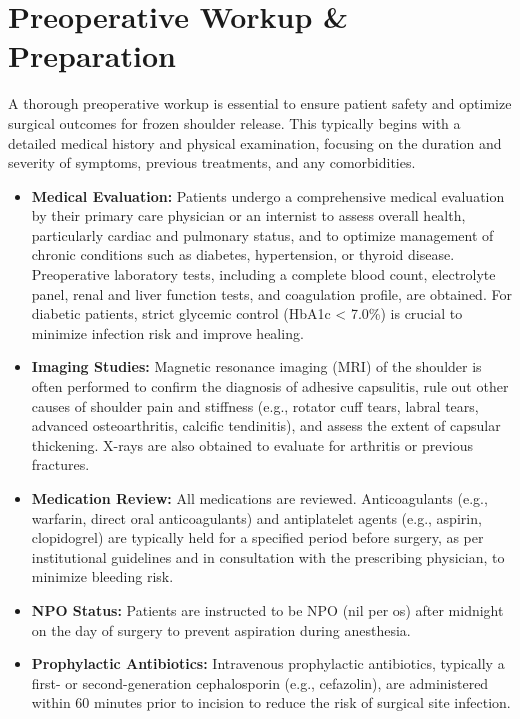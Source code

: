 \section*{Preoperative Workup \& Preparation}
A thorough preoperative workup is essential to ensure patient safety and optimize surgical outcomes for frozen shoulder release. This typically begins with a detailed medical history and physical examination, focusing on the duration and severity of symptoms, previous treatments, and any comorbidities.

\begin{itemize}
  \item \textbf{Medical Evaluation:} Patients undergo a comprehensive medical evaluation by their primary care physician or an internist to assess overall health, particularly cardiac and pulmonary status, and to optimize management of chronic conditions such as diabetes, hypertension, or thyroid disease. Preoperative laboratory tests, including a complete blood count, electrolyte panel, renal and liver function tests, and coagulation profile, are obtained. For diabetic patients, strict glycemic control (HbA1c < 7.0\%) is crucial to minimize infection risk and improve healing.
  
  \item \textbf{Imaging Studies:} Magnetic resonance imaging (MRI) of the shoulder is often performed to confirm the diagnosis of adhesive capsulitis, rule out other causes of shoulder pain and stiffness (e.g., rotator cuff tears, labral tears, advanced osteoarthritis, calcific tendinitis), and assess the extent of capsular thickening. X-rays are also obtained to evaluate for arthritis or previous fractures.
  
  \item \textbf{Medication Review:} All medications are reviewed. Anticoagulants (e.g., warfarin, direct oral anticoagulants) and antiplatelet agents (e.g., aspirin, clopidogrel) are typically held for a specified period before surgery, as per institutional guidelines and in consultation with the prescribing physician, to minimize bleeding risk.
  
  \item \textbf{NPO Status:} Patients are instructed to be NPO (nil per os) after midnight on the day of surgery to prevent aspiration during anesthesia.
  
  \item \textbf{Prophylactic Antibiotics:} Intravenous prophylactic antibiotics, typically a first- or second-generation cephalosporin (e.g., cefazolin), are administered within 60 minutes prior to incision to reduce the risk of surgical site infection.
  

\end{itemize}
